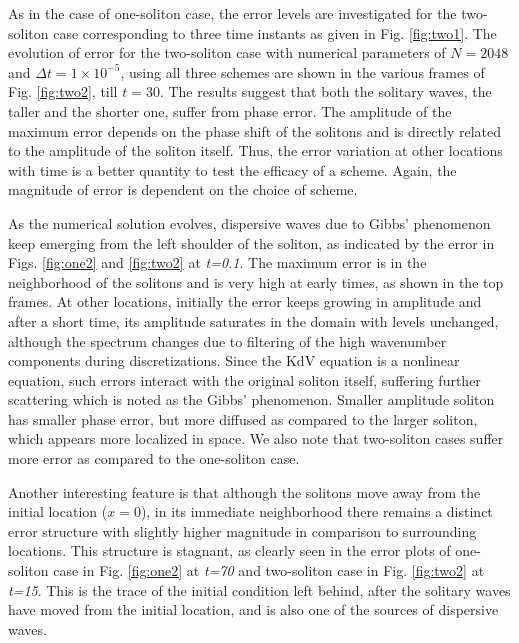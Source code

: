 As in the case of one-soliton case, the error levels are investigated for the two-soliton case corresponding to three time instants as given in Fig. \ref{fig:two1}.
The evolution of error for the two-soliton case with numerical parameters of $N=2048$ and $\Delta t = 1 \times 10^{-5}$, using 
all three schemes are shown in the various frames of Fig. \ref{fig:two2}, till $t=30$. The results suggest that both the solitary waves, 
the taller and the shorter one, suffer from phase error. The amplitude of the maximum error depends on the phase shift of the solitons and is directly related to the amplitude of the soliton itself. Thus, the error variation at other locations with time is a better quantity to test the efficacy of a scheme. Again, the magnitude of error is dependent on the choice of scheme.

As the numerical solution evolves, dispersive waves due to Gibbs' phenomenon keep emerging from the left shoulder of the soliton, as indicated by the 
error in Figs. \ref{fig:one2} and \ref{fig:two2} at \emph{t=0.1}. The maximum error is in the neighborhood 
of the solitons and is very high at early times, as shown in the top frames. At other locations, initially 
the error keeps growing in amplitude and after a short time, its amplitude saturates in the domain with levels unchanged, although the spectrum changes 
due to filtering of the high wavenumber components during discretizations. Since the KdV equation is a nonlinear equation, such errors interact with the 
original soliton itself, suffering further scattering which is noted as the Gibbs' phenomenon. Smaller amplitude soliton has smaller phase error, but 
more diffused as compared to the larger soliton, which appears more localized in space. We also note that two-soliton cases suffer more error as compared to the one-soliton case.

Another interesting feature is that although the solitons move away from the initial location ($x=0$), in its immediate neighborhood there remains a distinct error structure with slightly higher magnitude in comparison to surrounding locations. This structure is stagnant, as clearly seen in the 
error plots of one-soliton case in Fig. \ref{fig:one2} at \emph{t=70} and two-soliton case in Fig. \ref{fig:two2} at \emph{t=15}. This is the trace of the initial condition left behind, 
after the solitary waves have moved from the initial location, and is also one of the sources of dispersive waves.


